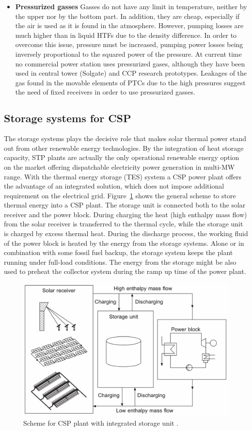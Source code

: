 \documentclass[Master,MEE,english]{twbook}%
\begin{document}
\begin{itemize}
\item \textbf{Pressurized gasses} Gasses do not have any limit in temperature, neither by the upper nor by the bottom part. In addition, they are cheap, especially if the air is used as it is found in the atmosphere. However, pumping losses are much higher than in liquid HTFs due to the density difference. In order to overcome this issue, pressure must be increased, pumping power losses being inversely proportional to the squared power of the pressure. At current time no commercial power station uses pressurized gases, although they have been used in central tower (Solgate) and CCP research prototypes. Leakages of the gas found in the movable elements of PTCs due to the high pressures suggest the need of fixed receivers in order to use pressurized gasses.
\end{itemize}
\subsection{Storage systems for CSP}\label{Subsection_storage_system}
The storage systems plays the decisive role that makes solar thermal power stand out from other renewable energy technologies. By the integration of heat storage capacity, STP plants are actually the only operational renewable energy option on the market offering dispatchable electricity power generation in multi-MW range. With the thermal energy storage (TES) system a CSP power plant offers the advantage of an integrated solution, which does not impose additional requirement on the electrical grid. Figure~\ref{integratedstoragescheme} shows the general scheme to store thermal energy into a CSP plant. The storage unit is connected both to the solar receiver and the power block. During charging the heat (high enthalpy mass flow) from the solar receiver is transferred to the thermal cycle, while the storage unit is charged by excess thermal heat. During the discharge process, the working fluid of the power block is heated by the energy from the  storage systems. Alone or in combination with some fossil fuel backup, the storage system keeps the plant running under full-load conditions. The energy from the storage might be also used to preheat the collector system during the ramp up time of the power plant.
\begin{figure}[h] 
\centering
\includegraphics[width=0.70\linewidth]{FIG/integratedstoragescheme}
\caption[Scheme for CSP plant with integrated storage unit.]{Scheme for CSP plant with integrated storage unit \cite{Steinmann2015}.}\label{integratedstoragescheme}
\end{figure}
\end{document}
